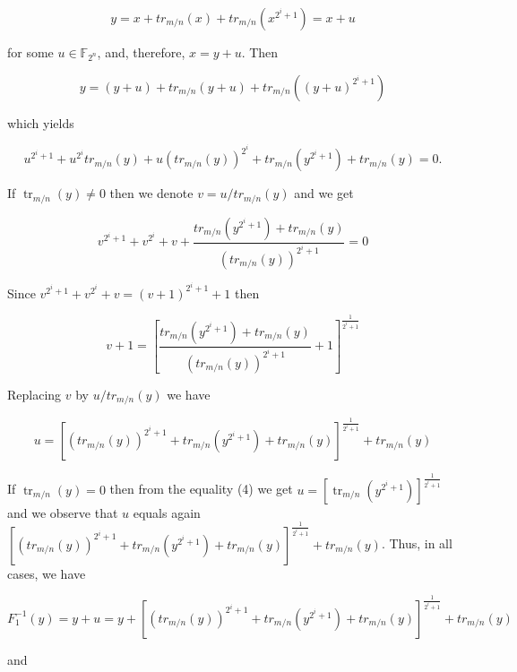 \documentclass[10pt]{article}
\begin{document}
$$
y=x+t r_{m / n}(x)+t r_{m / n}\left(x^{2^{i}+1}\right)=x+u
$$

for some $u \in \mathbb{F}_{2^{n}}$, and, therefore, $x=y+u$. Then

$$
y=(y+u)+t r_{m / n}(y+u)+t r_{m / n}\left((y+u)^{2^{i}+1}\right)
$$

which yields


\begin{equation*}
u^{2^{i}+1}+u^{2^{i}} t r_{m / n}(y)+u\left(t r_{m / n}(y)\right)^{2^{i}}+t r_{m / n}\left(y^{2^{i}+1}\right)+t r_{m / n}(y)=0 . \tag{4}
\end{equation*}


If $\operatorname{tr}_{m / n}(y) \neq 0$ then we denote $v=u / t r_{m / n}(y)$ and we get

$$
v^{2^{i}+1}+v^{2^{i}}+v+\frac{t r_{m / n}\left(y^{2^{i}+1}\right)+t r_{m / n}(y)}{\left(t r_{m / n}(y)\right)^{2^{i}+1}}=0
$$

Since $v^{2^{i}+1}+v^{2^{i}}+v=(v+1)^{2^{i}+1}+1$ then

$$
v+1=\left[\frac{t r_{m / n}\left(y^{2^{i}+1}\right)+t r_{m / n}(y)}{\left(t r_{m / n}(y)\right)^{2^{i}+1}}+1\right]^{\frac{1}{2^{i}+1}}
$$

Replacing $v$ by $u / t r_{m / n}(y)$ we have

$$
u=\left[\left(t r_{m / n}(y)\right)^{2^{i}+1}+t r_{m / n}\left(y^{2^{i}+1}\right)+t r_{m / n}(y)\right]^{\frac{1}{2^{i}+1}}+t r_{m / n}(y)
$$

If $\operatorname{tr}_{m / n}(y)=0$ then from the equality (4) we get $u=\left[\operatorname{tr}_{m / n}\left(y^{2^{i}+1}\right)\right]^{\frac{1}{2^{i}+1}}$ and we observe that $u$ equals again $\left[\left(t r_{m / n}(y)\right)^{2^{i}+1}+t r_{m / n}\left(y^{2^{i}+1}\right)+t r_{m / n}(y)\right]^{\frac{1}{2^{i}+1}}+t r_{m / n}(y)$. Thus, in all cases, we have

$$
F_{1}^{-1}(y)=y+u=y+\left[\left(t r_{m / n}(y)\right)^{2^{i}+1}+t r_{m / n}\left(y^{2^{i}+1}\right)+t r_{m / n}(y)\right]^{\frac{1}{2^{i}+1}}+t r_{m / n}(y)
$$

and
\end{document}
